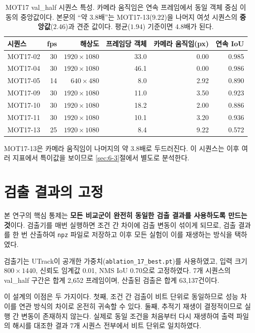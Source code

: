 \documentclass[12pt,a4paper,oneside]{report}
\begin{document}
\begin{table}[htbp]
\centering
\small
\caption{MOT17 val\_half 시퀀스 특성. 카메라 움직임은 연속 프레임에서 동일 객체 중심 이동의 중앙값이다. 본문의 ``약 $3.8$배''는 MOT17-13($9.22$)을 나머지 여섯 시퀀스의 \textbf{중앙값}($2.46$)과 견준 값이다. 평균($1.94$) 기준이면 $4.8$배가 된다.}
\label{tab:seqs}
\begin{tabular}{lrrrrr}
\toprule
시퀀스 & fps & 해상도 & 프레임당 객체 & 카메라 움직임(px) & 연속 IoU \\
\midrule
MOT17-02 & 30 & $1920{\times}1080$ & 33.0 & 0.00 & 0.985 \\
MOT17-04 & 30 & $1920{\times}1080$ & 46.1 & 0.00 & 0.986 \\
MOT17-05 & 14 & $640{\times}480$   &  8.0 & 2.92 & 0.890 \\
MOT17-09 & 30 & $1920{\times}1080$ & 11.0 & 3.50 & 0.923 \\
MOT17-10 & 30 & $1920{\times}1080$ & 18.2 & 2.00 & 0.886 \\
MOT17-11 & 30 & $1920{\times}1080$ & 10.1 & 3.20 & 0.936 \\
MOT17-13 & 25 & $1920{\times}1080$ &  8.4 & 9.22 & 0.572 \\
\bottomrule
\end{tabular}
\end{table}

MOT17-13은 카메라 움직임이 나머지의 약 3.8배로 두드러진다. 이 시퀀스는 이후 여러 지표에서 특이값을 보이므로 \ref{sec:6-3}절에서 별도로 분석한다.

\section{검출 결과의 고정}\label{sec:3-2}

본 연구의 핵심 통제는 \textbf{모든 비교군이 완전히 동일한 검출 결과를 사용하도록 만드는 것}이다. 검출기를 매번 실행하면 조건 간 차이에 검출 변동이 섞이게 되므로, 검출 결과를 한 번 산출하여 \texttt{npz} 파일로 저장하고 이후 모든 실험이 이를 재생하는 방식을 택하였다.

검출기는 UTrack이 공개한 가중치(\texttt{ablation\_17\_best.pt})를 사용하였고, 입력 크기 $800{\times}1440$, 신뢰도 임계값 0.01, NMS IoU 0.70으로 고정하였다. 7개 시퀀스의 val\_half 구간은 합계 2{,}652 프레임이며, 산출된 검출은 합계 63{,}137건이다.

이 설계의 이점은 두 가지이다. 첫째, 조건 간 검출이 비트 단위로 동일하므로 성능 차이를 연관 방식의 차이로 온전히 귀속할 수 있다. 둘째, 추적기 재생이 결정적이므로 실행 간 변동이 존재하지 않는다. 실제로 동일 조건을 처음부터 다시 재생하여 출력 파일의 해시를 대조한 결과 7개 시퀀스 전부에서 비트 단위로 일치하였다.
\end{document}
